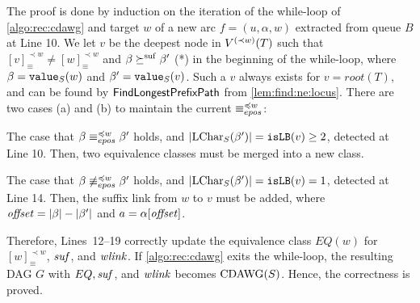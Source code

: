 \documentclass{article}
\begin{document}
\begin{proofsketch}
  The proof is done by induction on the iteration of the while-loop of \cref{algo:rec:cdawg} and target $w$ of a new arc $f = (u, \alpha, w)$ extracted from queue $B$ at Line 10. 
  We let $v$ be the deepest node in $V\rk{\prec w}(T)$ such that $[v]^{\prec w}_{\equiv} \not= [w]^{\prec w}_{\equiv}$ and $\beta \succeqsuf \beta'$ (*) in the beginning of the while-loop, where $\beta = \Value(w)$ and $\beta' = \Value(v)$.
  Such a $v$ always exists for $v = root(T)$, and 
  can be found by $\FindNonEquivLocus$ from \cref{lem:find:ne:locus}. 
  There are two cases (a) and (b) to maintain the current $\eqepos[\preceq w]$:
\begin{enumerate*}[(a)]
\item The case that $\beta \eqepos[\preceq w] \beta'$ holds, and $|\LChar(\beta')| = \op{isLB}(v) \ge 2$, detected at Line 10. Then, two equivalence classes must be merged into a new class. 
\item The case that $\beta \not\eqepos[\preceq w] \beta'$ holds, and $|\LChar(\beta')| = \op{isLB}(v) = 1$, detected at Line 14. Then, the suffix link from $w$ to $v$ must be added, where $\id{offset} = |\beta| - |\beta'|$ and $a = \alpha[\id{offset}]$. 
\end{enumerate*}
Therefore, Lines~12--19 correctly update the equivalence class $EQ(w)$ for $[w]^{\prec w}_{\equiv}$, $\id{suf}$, and $\id{wlink}$. If \cref{algo:rec:cdawg} exits the while-loop, the resulting DAG $G$ with $EQ, \id{suf}$, and $\id{wlink}$ becomes $\CDAWG(S)$. Hence, the correctness is proved. 
\end{proofsketch}
\end{document}
